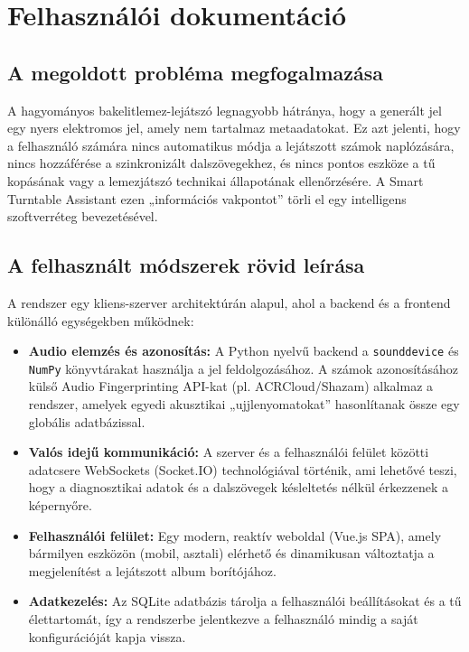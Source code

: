 \documentclass[12pt,a4paper,hungarian]{report}
\begin{document}
\chapter{Felhasználói dokumentáció}

\section{A megoldott probléma megfogalmazása}
A hagyományos bakelitlemez-lejátszó legnagyobb hátránya, hogy a generált jel egy nyers elektromos jel, amely nem tartalmaz metaadatokat. Ez azt jelenti, hogy a felhasználó számára nincs automatikus módja a lejátszott számok naplózására, nincs hozzáférése a szinkronizált dalszövegekhez, és nincs pontos eszköze a tű kopásának vagy a lemezjátszó technikai állapotának ellenőrzésére. A Smart Turntable Assistant ezen „információs vakpontot” törli el egy intelligens szoftverréteg bevezetésével.

\section{A felhasznált módszerek rövid leírása}
A rendszer egy kliens-szerver architektúrán alapul, ahol a backend és a frontend különálló egységekben működnek:
\begin{itemize}
    \item \textbf{Audio elemzés és azonosítás:} A Python nyelvű backend a \texttt{sounddevice} és \texttt{NumPy} könyvtárakat használja a jel feldolgozásához. A számok azonosításához külső Audio Fingerprinting API-kat (pl. ACRCloud/Shazam) alkalmaz a rendszer, amelyek egyedi akusztikai „ujjlenyomatokat” hasonlítanak össze egy globális adatbázissal.
    \item \textbf{Valós idejű kommunikáció:} A szerver és a felhasználói felület közötti adatcsere WebSockets (Socket.IO) technológiával történik, ami lehetővé teszi, hogy a diagnosztikai adatok és a dalszövegek késleltetés nélkül érkezzenek a képernyőre.
    \item \textbf{Felhasználói felület:} Egy modern, reaktív weboldal (Vue.js SPA), amely bármilyen eszközön (mobil, asztali) elérhető és dinamikusan változtatja a megjelenítést a lejátszott album borítójához.
    \item \textbf{Adatkezelés:} Az SQLite adatbázis tárolja a felhasználói beállításokat és a tű élettartomát, így a rendszerbe jelentkezve a felhasználó mindig a saját konfigurációját kapja vissza.
\end{itemize}
\end{document}
